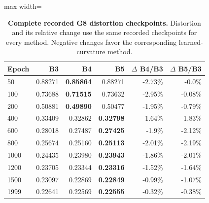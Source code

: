 \begin{table}[t]
\centering
\caption{\textbf{Complete recorded G8 distortion checkpoints.} Distortion and its relative change use the same recorded checkpoints for every method. Negative changes favor the corresponding learned-curvature method.}
\label{tab:g8}
\footnotesize\setlength{\tabcolsep}{4.2pt}\renewcommand{\arraystretch}{1.12}
\begin{adjustbox}{max width=\linewidth}
\begin{tabular}{lrrrrr}
\toprule
Epoch & B3 & B4 & B5 & $\Delta$ B4/B3 & $\Delta$ B5/B3 \\
\midrule
50 & 0.88271 & \textbf{0.85864} & \cellcolor{oursbg}0.88271 & -2.73\% & -0.0\% \\
100 & 0.73688 & \textbf{0.71515} & \cellcolor{oursbg}0.73632 & -2.95\% & -0.08\% \\
200 & 0.50881 & \textbf{0.49890} & \cellcolor{oursbg}0.50477 & -1.95\% & -0.79\% \\
400 & 0.33409 & 0.32862 & \cellcolor{oursbg}\textbf{0.32798} & -1.64\% & -1.83\% \\
600 & 0.28018 & 0.27487 & \cellcolor{oursbg}\textbf{0.27425} & -1.9\% & -2.12\% \\
800 & 0.25674 & 0.25160 & \cellcolor{oursbg}\textbf{0.25113} & -2.01\% & -2.19\% \\
1000 & 0.24435 & 0.23980 & \cellcolor{oursbg}\textbf{0.23943} & -1.86\% & -2.01\% \\
1200 & 0.23705 & 0.23344 & \cellcolor{oursbg}\textbf{0.23316} & -1.52\% & -1.64\% \\
1500 & 0.23097 & 0.22869 & \cellcolor{oursbg}\textbf{0.22849} & -0.99\% & -1.07\% \\
1999 & 0.22641 & 0.22569 & \cellcolor{oursbg}\textbf{0.22555} & -0.32\% & -0.38\% \\
\bottomrule
\end{tabular}
\end{adjustbox}
\end{table}
